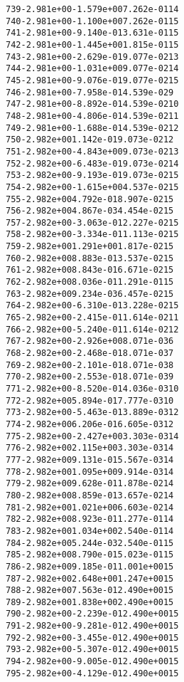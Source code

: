 \begin{alltt}
 739  -2.981e+00  -1.579e+00   7.262e-01   14
 740  -2.981e+00  -1.100e+00   7.262e-01   15
 741  -2.981e+00  -9.140e-01   3.631e-01   15
 742  -2.981e+00  -1.445e+00   1.815e-01   15
 743  -2.981e+00  -2.629e-01   9.077e-02   13
 744  -2.981e+00  -1.031e+00   9.077e-02   14
 745  -2.981e+00  -9.076e-01   9.077e-02   15
 746  -2.981e+00  -7.958e-01   4.539e-02    9
 747  -2.981e+00  -8.892e-01   4.539e-02   10
 748  -2.981e+00  -4.806e-01   4.539e-02   11
 749  -2.981e+00  -1.688e-01   4.539e-02   12
 750  -2.982e+00   1.142e-01   9.073e-02   12
 751  -2.982e+00  -4.843e+00   9.073e-02   13
 752  -2.982e+00  -6.483e-01   9.073e-02   14
 753  -2.982e+00  -9.193e-01   9.073e-02   15
 754  -2.982e+00  -1.615e+00   4.537e-02   15
 755  -2.982e+00   4.792e-01   8.907e-02   15
 756  -2.982e+00   4.867e-03   4.454e-02   15
 757  -2.982e+00  -3.063e-01   2.227e-02   15
 758  -2.982e+00  -3.334e-01   1.113e-02   15
 759  -2.982e+00   1.291e+00   1.817e-02   15
 760  -2.982e+00   8.883e-01   3.537e-02   15
 761  -2.982e+00   8.843e-01   6.671e-02   15
 762  -2.982e+00   8.036e-01   1.291e-01   15
 763  -2.982e+00   9.234e-03   6.457e-02   15
 764  -2.982e+00  -6.310e-01   3.228e-02   15
 765  -2.982e+00  -2.415e-01   1.614e-02   11
 766  -2.982e+00  -5.240e-01   1.614e-02   12
 767  -2.982e+00  -2.926e+00   8.071e-03    6
 768  -2.982e+00  -2.468e-01   8.071e-03    7
 769  -2.982e+00  -2.101e-01   8.071e-03    8
 770  -2.982e+00  -2.553e-01   8.071e-03    9
 771  -2.982e+00  -8.520e-01   4.036e-03   10
 772  -2.982e+00   5.894e-01   7.777e-03   10
 773  -2.982e+00  -5.463e-01   3.889e-03   12
 774  -2.982e+00   6.206e-01   6.605e-03   12
 775  -2.982e+00  -2.427e+00   3.303e-03   14
 776  -2.982e+00   2.115e+00   3.303e-03   14
 777  -2.982e+00   9.131e-01   5.567e-03   14
 778  -2.982e+00   1.095e+00   9.914e-03   14
 779  -2.982e+00   9.628e-01   1.878e-02   14
 780  -2.982e+00   8.859e-01   3.657e-02   14
 781  -2.982e+00   1.021e+00   6.603e-02   14
 782  -2.982e+00   8.923e-01   1.277e-01   14
 783  -2.982e+00   1.034e+00   2.540e-01   14
 784  -2.982e+00   5.244e-03   2.540e-01   15
 785  -2.982e+00   8.790e-01   5.023e-01   15
 786  -2.982e+00   9.185e-01   1.001e+00   15
 787  -2.982e+00   2.648e+00   1.247e+00   15
 788  -2.982e+00   7.563e-01   2.490e+00   15
 789  -2.982e+00   1.838e+00   2.490e+00   15
 790  -2.982e+00  -2.239e-01   2.490e+00   15
 791  -2.982e+00  -9.281e-01   2.490e+00   15
 792  -2.982e+00  -3.455e-01   2.490e+00   15
 793  -2.982e+00  -5.307e-01   2.490e+00   15
 794  -2.982e+00  -9.005e-01   2.490e+00   15
 795  -2.982e+00  -4.129e-01   2.490e+00   15

\end{alltt}

